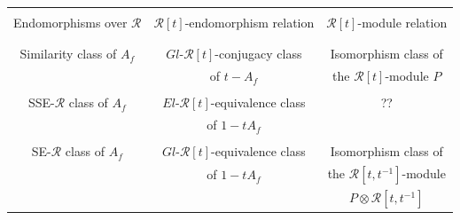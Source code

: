 \documentclass{amsart}
\theoremstyle{definition}
\theoremstyle{definition}
\newcommand{\calR}{\mathcal{R}}
\numberwithin{equation}{subsection}
\begin{document}

\begin{center}
    \begin{tabular}{ c | c | c }
    \hline
     & & \\
 Endomorphisms
     over $\calR$ \hspace{.05in} & \hspace{.05in} $\calR[t]$-endomorphism relation \hspace{.05in} & \hspace{.05in} $\calR[t]$-module
       relation \hspace{.05in}\\
       & & \\ \hline
            & & \\
    Similarity class of $A_{f}$ & $Gl$-$\calR[t]$-conjugacy class & Isomorphism class of \\
         & of $t-A_{f}$ & the $\calR[t]$-module $P$ \\
              & & \\
    SSE-$\calR$ class of $A_{f}$ & $El$-$\calR[t]$-equivalence class & ?? \\
         &  of $1-tA_{f}$  & \\
              & & \\
    SE-$\calR$ class of $A_{f}$ & $Gl$-$\calR[t]$-equivalence class  & Isomorphism class of\\
         & of $1-tA_{f}$ & the $\calR[t,t^{-1}]$-module\\
         & &  $P \otimes \calR[t,t^{-1}]$\\ \hline
    \end{tabular}
\end{center}
\end{document}

